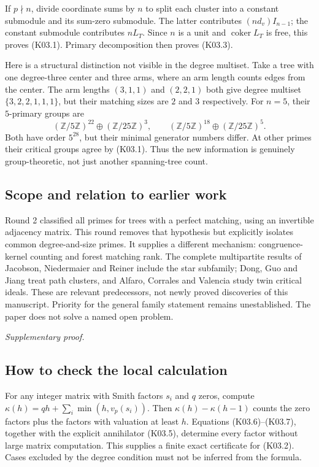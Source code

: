 \documentclass[11pt,a4paper]{article}
\theoremstyle{definition}\newtheorem{definition}[theorem]{Definition}
\theoremstyle{remark}\newtheorem{remark}[theorem]{Remark}
\newcommand{\Z}{\mathbb Z}\newcommand{\Q}{\mathbb Q}\newcommand{\F}{\mathbb F}
\DeclareMathOperator{\coker}{coker}\DeclareMathOperator{\diag}{diag}\DeclareMathOperator{\rank}{rank}
\numberwithin{equation}{section}
\begin{document}
If $p\nmid n$, divide coordinate sums by $n$ to split each cluster into a constant submodule and its sum-zero submodule. The latter contributes $(nd_v)I_{n-1}$; the constant submodule contributes $nL_T$. Since $n$ is a unit and $\coker L_T$ is free, this proves (K03.1). Primary decomposition then proves (K03.3).

Here is a structural distinction not visible in the degree multiset. Take a tree with one degree-three center and three arms, where an arm length counts edges from the center. The arm lengths $(3,1,1)$ and $(2,2,1)$ both give degree multiset $\{3,2,2,1,1,1\}$, but their matching sizes are $2$ and $3$ respectively. For $n=5$, their $5$-primary groups are
\[
 (\Z/5\Z)^{22}\oplus(\Z/25\Z)^3,
 \qquad (\Z/5\Z)^{18}\oplus(\Z/25\Z)^5.                      \tag{K03.9}
\]
Both have order $5^{28}$, but their minimal generator numbers differ. At other primes their critical groups agree by (K03.1). Thus the new information is genuinely group-theoretic, not just another spanning-tree count.

\subsection{Scope and relation to earlier work}\label{K03-sec-5}
Round 2 classified all primes for trees with a perfect matching, using an invertible adjacency matrix. This round removes that hypothesis but explicitly isolates common degree-and-size primes. It supplies a different mechanism: congruence-kernel counting and forest matching rank. The complete multipartite results of Jacobson, Niedermaier and Reiner \cite{ref032} include the star subfamily; Dong, Guo and Jiang \cite{ref028} treat path clusters, and Alfaro, Corrales and Valencia \cite{ref029} study twin critical ideals. These are relevant predecessors, not newly proved discoveries of this manuscript. Priority for the general family statement remains unestablished. The paper does not solve a named open problem.

\medskip\noindent\textit{Supplementary proof.}\par
\subsection{How to check the local calculation}\label{K03-sec-6}
For any integer matrix with Smith factors $s_i$ and $q$ zeros, compute $\kappa(h)=qh+\sum_i\min(h,v_p(s_i))$. Then $\kappa(h)-\kappa(h-1)$ counts the zero factors plus the factors with valuation at least $h$. Equations (K03.6)--(K03.7), together with the explicit annihilator (K03.5), determine every factor without large matrix computation. This supplies a finite exact certificate for (K03.2). Cases excluded by the degree condition must not be inferred from the formula.
\end{document}

